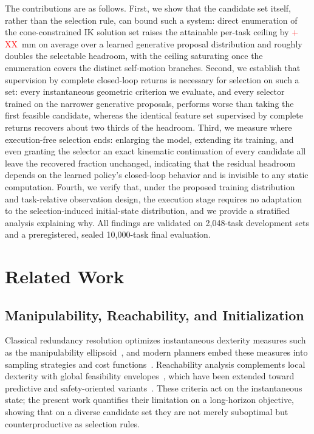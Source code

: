 \documentclass[journal]{IEEEtran}
\newcommand{\ph}[1]{\textcolor{red}{#1}}          %
\newcommand{\nDev}{2{,}048}
\newcommand{\nSealed}{10{,}000}
\newcommand{\phOracleGap}{\ph{$+$XX}}        %
\begin{document}
The contributions are as follows. First, we show that the candidate set
itself, rather than the selection rule, can bound such a system: direct
enumeration of the cone-constrained IK solution set raises the attainable
per-task ceiling by \phOracleGap~mm on average over a learned generative
proposal distribution and roughly doubles the selectable headroom, with
the ceiling saturating once the enumeration covers the distinct
self-motion branches. Second, we establish that supervision by complete
closed-loop returns is necessary for selection on such a set: every
instantaneous geometric criterion we evaluate, and every selector trained
on the narrower generative proposals, performs worse than taking the
first feasible candidate, whereas the identical feature set supervised by
complete returns recovers about two thirds of the headroom. Third, we
measure where execution-free selection ends: enlarging the model,
extending its training, and even granting the selector an exact kinematic
continuation of every candidate all leave the recovered fraction
unchanged, indicating that the residual headroom depends on the learned
policy's closed-loop behavior and is invisible to any static computation.
Fourth, we verify that, under the proposed training distribution and
task-relative observation design, the execution stage requires no
adaptation to the selection-induced initial-state distribution, and we
provide a stratified analysis explaining why. All findings are validated
on \nDev-task development sets and a preregistered, sealed \nSealed-task
final evaluation.

\section{Related Work}
\label{sec:related}

\subsection{Manipulability, Reachability, and Initialization}
Classical redundancy resolution optimizes instantaneous dexterity
measures such as the manipulability
ellipsoid~\cite{yoshikawa1985manipulability}, and modern planners embed
these measures into sampling strategies and cost
functions~\cite{jin2017manipulability,shen2023adaptive,cai2025just}.
Reachability analysis complements local dexterity with global feasibility
envelopes~\cite{yang2009placement,makhal2018reuleaux}, which have been
extended toward predictive and safety-oriented
variants~\cite{feng2025predictive,jauhri2022robot,selim2022safe}. These
criteria act on the instantaneous state; the present work quantifies
their limitation on a long-horizon objective, showing that on a diverse
candidate set they are not merely suboptimal but counterproductive as
selection rules.
\end{document}
